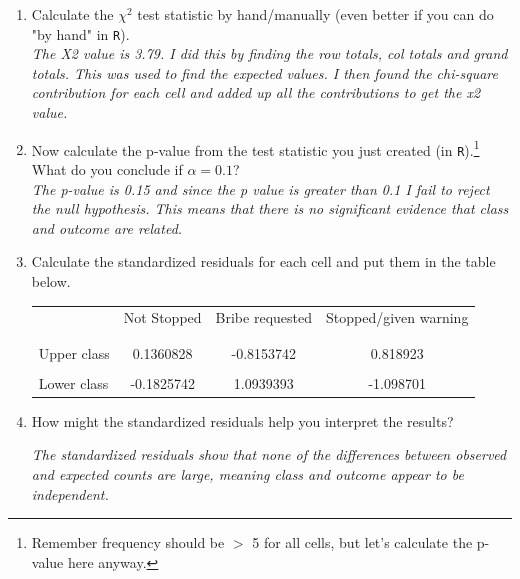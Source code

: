 \documentclass[12pt,letterpaper]{article}
\begin{document}
\begin{enumerate}
	
	\item [(a)]
	Calculate the $\chi^2$ test statistic by hand/manually (even better if you can do "by hand" in \texttt{R}).\\
	  
	\textit{ The X2 value is 3.79. I did this by finding the row totals, col totals and grand totals. This was used to find the expected values. I then found the chi-square contribution for each cell and added up all the contributions to get the x2 value. }
	\item [(b)]
	Now calculate the p-value from the test statistic you just created (in \texttt{R}).\footnote{Remember frequency should be $>$ 5 for all cells, but let's calculate the p-value here anyway.}  What do you conclude if $\alpha = 0.1$?\\
		 
			\textit{The p-value is 0.15 and since the p value is greater than 0.1 I fail to reject the null hypothesis. This means that there is no significant evidence that class and outcome are related.}
	\newpage
	\item [(c)] Calculate the standardized residuals for each cell and put them in the table below.
	\vspace{1cm}
	
	
	\begin{table}[h]
		\centering
		\begin{tabular}{l | c c c }
			& Not Stopped & Bribe requested & Stopped/given warning \\
			\\[-1.8ex] 
			\hline \\[-1.8ex]
			Upper class  & 0.1360828 & -0.8153742 & 0.818923 \\
			\\
			Lower class &-0.1825742 &1.0939393 & -1.098701  \\
			
		\end{tabular}
	\end{table}
	
	
	\vspace{7cm}
	\item [(d)] How might the standardized residuals help you interpret the results?
		
		\textit{The standardized residuals show that none of the differences between observed and expected counts are large, meaning class and outcome appear to be independent.}
	
\end{enumerate}
\newpage
\end{document}
